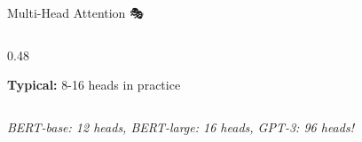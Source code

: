 \documentclass[aspectratio=169]{beamer}
\begin{document}
\begin{frame}[shrink=5]{Multi-Head Attention 🎭}
\begin{columns}[T]
\begin{column}{0.48\textwidth}
\begin{center}
\end{center}

\vspace{0.5em}
\textbf{Typical:} 8-16 heads in practice
\end{column}
\end{columns}

\vspace{0.5em}
\textit{BERT-base: 12 heads, BERT-large: 16 heads, GPT-3: 96 heads!}
\end{frame}

\end{document}
